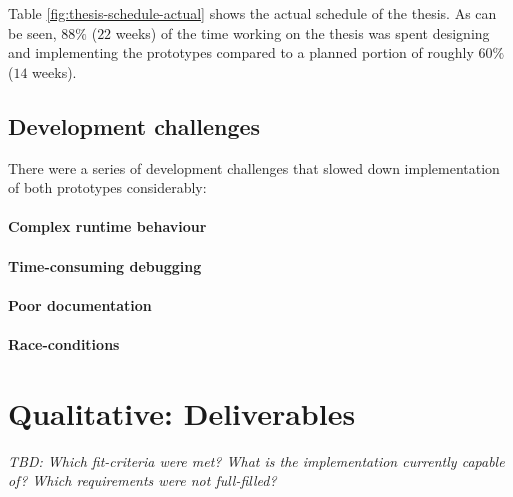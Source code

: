 Table \ref{fig:thesis-schedule-actual} shows the actual schedule of the thesis. As can be seen, $88\%$ ($22$ weeks) of the time working on the thesis was spent designing and implementing the prototypes compared to a planned portion of roughly $60\%$ ($14$ weeks).


\subsection{Development challenges}
\label{par:challenges}
There were a series of development challenges that slowed down implementation of both prototypes considerably:
\paragraph{Complex runtime behaviour}
\paragraph{Time-consuming debugging}
\paragraph{Poor documentation}
\paragraph{Race-conditions}


\section{Qualitative: Deliverables}
\label{sec:tool-selection}
\emph{TBD: Which fit-criteria were met? What is the implementation currently capable of? Which requirements were not full-filled?}